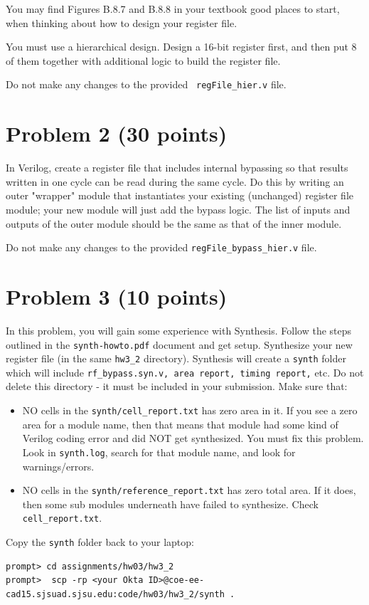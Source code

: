 \documentclass[12pt]{article}
\begin{document}
You may find Figures B.8.7 and B.8.8 in your textbook good places to start, when thinking about how to
design your register file.

You must use a hierarchical design. Design a 16-bit register first, and then put 8 of them together with
additional logic to build the register file.

Do not make any changes to the provided \texttt{ regFile\_hier.v} file.

\section*{Problem 2 (30 points)}

In Verilog, create a register file that includes internal bypassing so that results written in one cycle can be
read during the same cycle. Do this by writing an outer "wrapper" module that instantiates your existing
(unchanged) register file module; your new module will just add the bypass logic. The list of inputs and
outputs of the outer module should be the same as that of the inner module.

Do not make any changes to the provided \texttt{regFile\_bypass\_hier.v} file.

\section*{Problem 3 (10 points)}
In this problem, you will gain some experience with Synthesis.  Follow the steps outlined in
the \texttt{synth-howto.pdf} document and get setup.
Synthesize your new register file (in the same \texttt{hw3\_2} directory).
Synthesis will create a \texttt{synth} folder which will include \texttt{rf\_bypass.syn.v, area report, timing report,} etc. Do not delete this directory - it must be included in your submission.
Make sure that:
\begin{itemize}
\item
NO cells in the \texttt{synth/cell\_report.txt} has zero area in it. If you see a zero area for a module name, then that means that module had some kind of Verilog coding error and did NOT get synthesized. You must fix this problem. Look in \texttt{synth.log}, search for that module name, and look for warnings/errors.
\item
NO cells in the \texttt{synth/reference\_report.txt} has zero total area. If it does, then some sub modules underneath have failed to synthesize. Check \texttt{cell\_report.txt}.
\end{itemize}
Copy the \texttt{synth} folder back to your laptop:
\begin{small}
\begin{verbatim}
prompt> cd assignments/hw03/hw3_2
prompt>  scp -rp <your Okta ID>@coe-ee-cad15.sjsuad.sjsu.edu:code/hw03/hw3_2/synth .
\end{verbatim}
\end{small}
\end{document}
